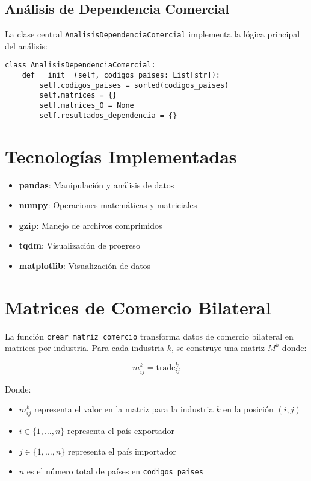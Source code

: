 \documentclass[11pt,a4paper]{article}
\begin{document}
\subsection{Análisis de Dependencia Comercial}
La clase central \texttt{AnalisisDependenciaComercial} implementa la lógica principal del análisis:

\begin{tcolorbox}[colback=codebackground,title=Clase Principal]
\begin{lstlisting}
class AnalisisDependenciaComercial:
    def __init__(self, codigos_paises: List[str]):
        self.codigos_paises = sorted(codigos_paises)
        self.matrices = {}
        self.matrices_O = None
        self.resultados_dependencia = {}
\end{lstlisting}
\end{tcolorbox}

\section{Tecnologías Implementadas}
\begin{itemize}[leftmargin=*]
    \item \textbf{pandas}: Manipulación y análisis de datos
    \item \textbf{numpy}: Operaciones matemáticas y matriciales
    \item \textbf{gzip}: Manejo de archivos comprimidos
    \item \textbf{tqdm}: Visualización de progreso
    \item \textbf{matplotlib}: Visualización de datos
\end{itemize}

\section{Matrices de Comercio Bilateral}

La función \texttt{crear\_matriz\_comercio} transforma datos de comercio bilateral en matrices por industria. Para cada industria $k$, se construye una matriz $M^k$ donde:

\begin{equation}
m^k_{ij} = \text{trade}_{ij}^k
\end{equation}

Donde:
\begin{itemize}
    \item $m^k_{ij}$ representa el valor en la matriz para la industria $k$ en la posición $(i,j)$
    \item $i \in \{1,\ldots,n\}$ representa el país exportador
    \item $j \in \{1,\ldots,n\}$ representa el país importador
    \item $n$ es el número total de países en \texttt{codigos\_paises}
\end{itemize}
\end{document}
